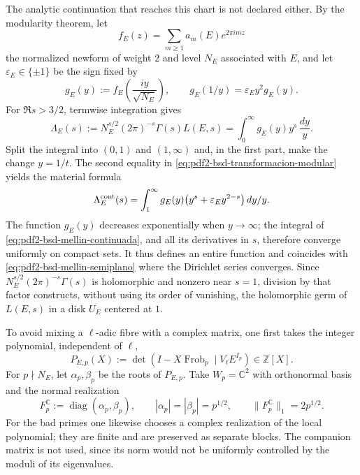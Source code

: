 The analytic continuation that reaches this chart is not declared either. By the
modularity theorem, let
\[
 f_E(z)=\sum_{m\geq1}a_m(E)e^{2\pi imz}
\]
the normalized newform of weight $2$ and level $N_E$ associated with $E$, and let
$\varepsilon_E\in\{\pm1\}$ be the sign fixed by
\begin{equation}\label{eq:pdf2-bsd-transformacion-modular}
 g_E(y):=f_E\!\left(\frac{iy}{\sqrt{N_E}}\right),
 \qquad
 g_E(1/y)=\varepsilon_Ey^2g_E(y).
\end{equation}
For $\Re s>3/2$, termwise integration gives
\begin{equation}\label{eq:pdf2-bsd-mellin-semiplano}
 \Lambda_E(s):=N_E^{s/2}(2\pi)^{-s}\Gamma(s)L(E,s)
 =\int_0^\infty g_E(y)y^s\,\frac{dy}{y}.
\end{equation}
Split the integral into $(0,1)$ and $(1,\infty)$ and, in the first part,
make the change $y=1/t$. The second equality in
\eqref{eq:pdf2-bsd-transformacion-modular} yields the material formula
\begin{equation}\label{eq:pdf2-bsd-mellin-continuada}
 \Lambda_E^{\rm cont}(s)=
 \int_1^\infty g_E(y)
       \bigl(y^s+\varepsilon_Ey^{2-s}\bigr)\,\frac{dy}{y}.
\end{equation}
The function $g_E(y)$ decreases exponentially when $y\to\infty$; the integral of \eqref{eq:pdf2-bsd-mellin-continuada}, and all its derivatives in $s$, therefore converge uniformly on compact sets. It thus defines an entire function and coincides with \eqref{eq:pdf2-bsd-mellin-semiplano} where the Dirichlet series converges. Since $N_E^{s/2}(2\pi)^{-s}\Gamma(s)$ is holomorphic and nonzero near $s=1$, division by that factor constructs, without using its order of vanishing, the holomorphic germ of $L(E,s)$ in a disk $U_E$ centered at $1$.

To avoid mixing a $\ell$-adic fibre with a complex matrix, one first takes
the integer polynomial, independent of $\ell$,
\begin{equation}\label{eq:pdf2-bsd-polinomio-local-entero}
 P_{E,p}(X):=\det(I-X\operatorname{Frob}_p\mid V_\ell E^{I_p})
 \in\mathbb Z[X].
\end{equation}
For $p\nmid N_E$, let $\alpha_p,\beta_p$ be the roots of $P_{E,p}$. Take
$W_p=\mathbb C^2$ with orthonormal basis and the normal realization
\begin{equation}\label{eq:pdf2-bsd-realizacion-normal-frobenius}
 F_p^{\mathbb C}:=\operatorname{diag}(\alpha_p,\beta_p),
 \qquad |\alpha_p|=|\beta_p|=p^{1/2},
 \qquad \|F_p^{\mathbb C}\|_1=2p^{1/2}.
\end{equation}
For the bad primes one likewise chooses a complex realization of the
local polynomial; they are finite and are preserved as separate blocks. The
companion matrix is not used, since its norm would not be uniformly controlled by the
moduli of its eigenvalues.

